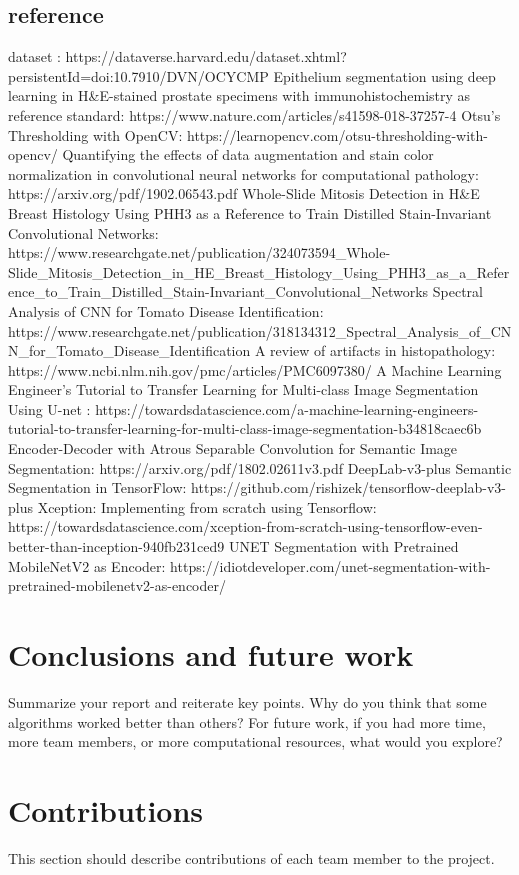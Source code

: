 \documentclass{article}
\begin{document}
\subsection{reference}
dataset : https://dataverse.harvard.edu/dataset.xhtml?persistentId=doi:10.7910/DVN/OCYCMP
Epithelium segmentation using deep learning in H&E-stained prostate specimens with immunohistochemistry as reference standard: https://www.nature.com/articles/s41598-018-37257-4
Otsu’s Thresholding with OpenCV: https://learnopencv.com/otsu-thresholding-with-opencv/
Quantifying the effects of data augmentation and stain color normalization in convolutional neural networks for computational pathology: https://arxiv.org/pdf/1902.06543.pdf
Whole-Slide Mitosis Detection in H&E Breast Histology Using PHH3 as a Reference to Train Distilled Stain-Invariant Convolutional Networks: https://www.researchgate.net/publication/324073594_Whole-Slide_Mitosis_Detection_in_HE_Breast_Histology_Using_PHH3_as_a_Reference_to_Train_Distilled_Stain-Invariant_Convolutional_Networks
Spectral Analysis of CNN for Tomato Disease Identification: https://www.researchgate.net/publication/318134312_Spectral_Analysis_of_CNN_for_Tomato_Disease_Identification
A review of artifacts in histopathology: https://www.ncbi.nlm.nih.gov/pmc/articles/PMC6097380/
A Machine Learning Engineer’s Tutorial to Transfer Learning for Multi-class Image Segmentation Using U-net : https://towardsdatascience.com/a-machine-learning-engineers-tutorial-to-transfer-learning-for-multi-class-image-segmentation-b34818caec6b 
Encoder-Decoder with Atrous Separable Convolution for Semantic Image Segmentation: https://arxiv.org/pdf/1802.02611v3.pdf
DeepLab-v3-plus Semantic Segmentation in TensorFlow: https://github.com/rishizek/tensorflow-deeplab-v3-plus
Xception: Implementing from scratch using Tensorflow: https://towardsdatascience.com/xception-from-scratch-using-tensorflow-even-better-than-inception-940fb231ced9
UNET Segmentation with Pretrained MobileNetV2 as Encoder: https://idiotdeveloper.com/unet-segmentation-with-pretrained-mobilenetv2-as-encoder/

\section{Conclusions and future work}
Summarize your report and reiterate key points. Why do you think that some algorithms worked better than others? For future work, if you had more time, more team members, or more computational resources, what would you explore?

\section{Contributions}
This section should describe contributions of each team member to the project.



\end{document}
